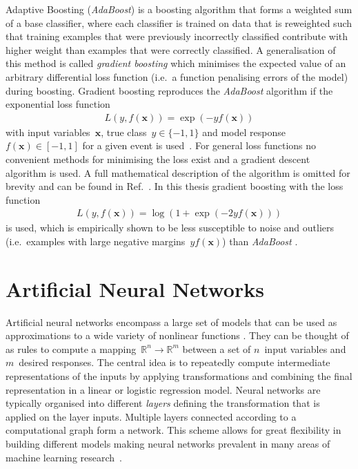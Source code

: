 Adaptive Boosting (\emph{AdaBoost}) is a boosting algorithm that forms a
weighted sum of a base classifier, where each classifier is trained on data that
is reweighted such that training examples  that were
previously incorrectly classified contribute with higher weight than examples
 that were correctly classified. A generalisation of
this method is called \emph{gradient boosting} which minimises the expected
value of an arbitrary differential loss function (i.e.\ a function penalising
errors of the model) during boosting. Gradient boosting reproduces the
\emph{AdaBoost} algorithm if the exponential loss function
\begin{align*}
  L\left(y, f(\mathbf{x})\right) = \exp\left(- y f(\mathbf{x})\right)
\end{align*}
with input variables~$\mathbf{x}$, true class~$y \in \{ -1, 1 \}$ and model
response~$f(\mathbf{x}) \in [-1, 1]$  for a
given event is used~\cite{esl}. For general loss functions no convenient methods
for minimising the loss exist and a gradient descent algorithm is used. A full
mathematical description of the algorithm is omitted for brevity and can be
found in Ref.~\cite{friedman_gbm, esl}. In this thesis gradient boosting with
the loss function
\begin{align*}
  L\left(y, f(\mathbf{x})\right) = \log\left( 1 + \exp(- 2 y f(\mathbf{x})) \right)
\end{align*}
is used, which is empirically shown to be less susceptible to noise
 and outliers (i.e.\
examples with large negative margins~$y f(\mathbf{x})$) than \emph{AdaBoost}
\cite{esl, schapire_boosting}.
%

\section{Artificial Neural Networks}
\label{sec:nn}

Artificial neural networks encompass a large set of models that can be used as
approximations to a wide variety of nonlinear functions \cite{hornik}. They can
be thought of as rules to compute a
mapping~\mbox{$\mathbb{R}^n \rightarrow \mathbb{R}^m$} between a set of
$n$~input variables and $m$~desired responses. The central idea is to repeatedly
compute intermediate representations of the inputs by applying transformations
and combining the final representation in a linear or logistic regression model.
Neural networks are typically organised into different \emph{layers} defining
the transformation that is applied on the layer inputs. Multiple layers
connected according to a computational graph form a network. This scheme allows
for great flexibility in building different models making neural networks
prevalent in many areas of machine learning research~\cite{goodfellow_dl}.

